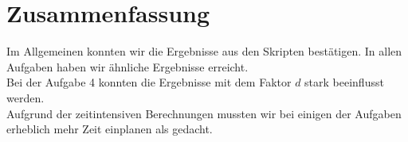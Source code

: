 \chapter{Zusammenfassung}

Im Allgemeinen konnten wir die Ergebnisse aus den Skripten bestätigen. In allen Aufgaben haben wir ähnliche Ergebnisse erreicht.\\

Bei der Aufgabe 4 konnten die Ergebnisse mit dem Faktor $d$ stark beeinflusst werden.\\

Aufgrund der zeitintensiven Berechnungen mussten wir bei einigen der Aufgaben erheblich mehr Zeit einplanen als gedacht.
